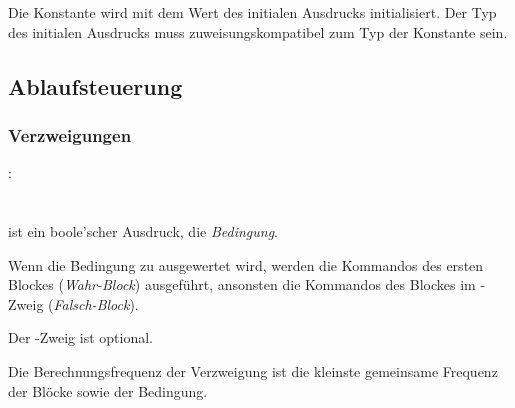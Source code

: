 Die Konstante wird mit dem Wert des initialen Ausdrucks initialisiert.
Der Typ des initialen Ausdrucks muss zuweisungskompatibel zum Typ der Konstante sein.

\subsection{Ablaufsteuerung}\label{Ablaufsteuerung}
\subsubsection{Verzweigungen}\label{Verzweigungen}
:\label{verzweigung}\\
\hspace*{1cm}\glq{}\grq  \glq\Gt{(}\grq  {}  \glq\Gt{)}\grq  \glq\Gt{\{}\grq  {}  \glq\Gt{\}}\grq \\
\hspace*{1cm}\glq{}\grq  \glq\Gt{(}\grq  {}  \glq\Gt{)}\grq  \glq\Gt{\{}\grq  {}  \glq\Gt{\}}\grq \glq{}\grq  \glq\Gt{\{}\grq  {}  \glq\Gt{\}}\grq \\

\glq{}\grq ist ein boole'scher Ausdruck, die \emph{Bedingung}.

Wenn die Bedingung zu  ausgewertet wird, werden die Kommandos des ersten Blockes (\emph{Wahr-Block}) ausgeführt,
ansonsten die Kommandos des Blockes im -Zweig (\emph{Falsch-Block}).

Der -Zweig ist optional.

Die Berechnungsfrequenz der Verzweigung ist die kleinste gemeinsame Frequenz der Blöcke sowie der Bedingung.

